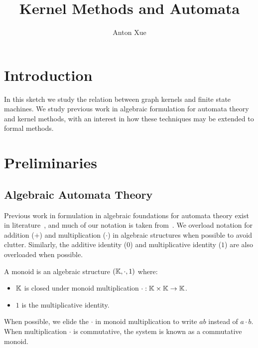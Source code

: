 \documentclass[12pt]{article}
\title{Kernel Methods and Automata}
\author{Anton Xue}
\date{}
\begin{document}
\maketitle

\section{Introduction}
In this sketch we study the relation between graph kernels and
finite state machines.
We study previous work in algebraic formulation for automata theory
and kernel methods, with an interest in how these techniques
may be extended to formal methods.



\section{Preliminaries}


\subsection{Algebraic Automata Theory}
Previous work in formulation in algebraic foundations for automata
theory exist in literature~\cite{kuich2012semirings},
and much of our notation is taken from~\cite{cortes2004rational}.
We overload notation for addition (\(+\)) and multiplication (\(\cdot\))
in algebraic structures when possible to avoid clutter.
Similarly, the additive identity (\(0\)) and multiplicative identity (\(1\))
are also overloaded when possible.

\begin{definition}[Monoid]
  A monoid is an algebraic structure \(\left(\mathbb{K}, \cdot, 1\right)\) where:
  
  \begin{itemize}
    \item
      \(\mathbb{K}\) is closed under monoid multiplication
      \(\cdot : \mathbb{K} \times \mathbb{K} \to \mathbb{K}\).

    \item
      \(1\) is the multiplicative identity.

  \end{itemize}

  When possible, we elide the \(\cdot\) in monoid multiplication to write
  \(ab\) instead of \(a \cdot b\).
  When multiplication \(\cdot\) is commutative,
  the system is known as a commutative monoid.
\end{definition}
\end{document}

